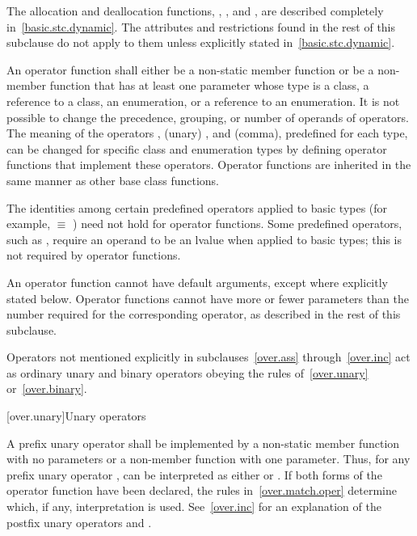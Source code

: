 \pnum
The allocation and deallocation functions,
,
,
and
,
are described completely in~\ref{basic.stc.dynamic}.
The attributes and restrictions
found in the rest of this subclause do not apply to them unless explicitly
stated in~\ref{basic.stc.dynamic}.

\pnum
{}%
An operator function
shall either be a non-static member function or be a non-member function that
has at least one parameter whose type is a class, a reference to a class, an
enumeration, or a reference to an enumeration.
It is not possible to change the precedence, grouping, or number of operands
of operators.
The meaning of the operators
\tcode{=},
(unary)
\tcode{\&},
and
\tcode{,}
(comma), predefined for each type, can be changed for specific
class and enumeration types by
defining operator functions that implement these operators.
%
Operator functions are inherited in the same manner as other base class
functions.

\pnum
{}%
The identities among certain predefined operators applied to basic types
(for example,
 $\equiv$
)
need not hold for operator functions.
Some predefined operators, such as
\tcode{+=},
require an operand to be an lvalue when applied to basic types;
this is not required by operator functions.

\pnum
{}%
An operator function cannot have default arguments,
except where explicitly stated below.
Operator
functions cannot have more or fewer parameters than the
number required for the corresponding operator, as
described in the rest of this subclause.

\pnum
Operators not mentioned explicitly in subclauses~\ref{over.ass} through~\ref{over.inc}
act as ordinary unary and binary
operators obeying the rules of~\ref{over.unary} or~\ref{over.binary}.%
%

[over.unary]{Unary operators}%
%

\pnum
A prefix unary operator shall be implemented by a
non-static member function with no parameters or a
non-member function with one parameter.
%
Thus, for any prefix unary operator
,
can be interpreted as either
or
.
If both forms of the operator function have been declared,
the rules in~\ref{over.match.oper} determine which, if any, interpretation is
used.
See~\ref{over.inc} for an explanation of the postfix unary operators
\tcode{++}
and
\tcode{\dcr}.

